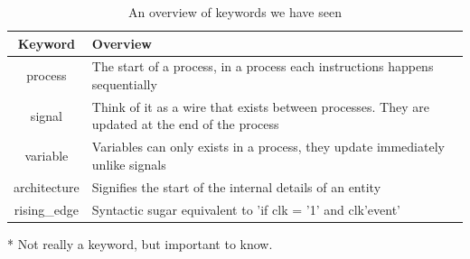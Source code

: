 \documentclass[11pt,a4paper]{article}
\newlength\myheight
\newlength\mydepth
\newcommand*\inlinegraphics[1]{%
  \settototalheight\myheight{Xygp}%
  \settodepth\mydepth{Xygp}%
  \raisebox{-\mydepth}{\texttt{[image: \#1]}}%
}
\newcommand{\handwaving}{\inlinegraphics{./src/hand.png}}
\begin{document}
\begin{table}
    \begin{center}
    \begin{threeparttable}
        \begin{tabular}{| c | m{ } |}
            \hline
             Keyword & Overview \\ \hline
             process & The start of a process, in a process each instructions happens sequentially \\ \hline
             signal & \handwaving Think of it as a wire that exists between processes. They are updated at the end of the process \\ \hline
             variable & \handwaving Variables can only exists in a process, they update immediately unlike signals \\ \hline
             architecture & Signifies the start of the internal details of an entity \\ \hline
             rising\_edge \tnote{*}& Syntactic sugar equivalent to 'if clk = '1' and clk'event' \\ \hline
        \end{tabular}
        \begin{tablenotes}
        \footnotesize
        \item[*] Not really a keyword, but important to know.
        \end{tablenotes}
        \end{threeparttable}
        \caption{An overview of keywords we have seen}
        \label{table:keywords}
    \end{center}
\end{table}
\end{document}
